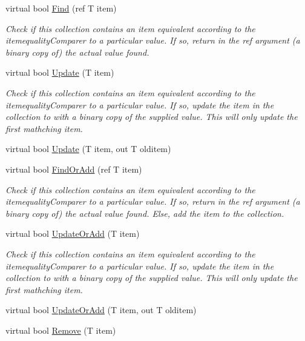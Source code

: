 \begin{DoxyCompactItemize}
virtual bool \hyperlink{class_c5_1_1_array_list_a835191c794936ab62f751aaef835254d}{Find} (ref T item)
\begin{DoxyCompactList}\small\item\em Check if this collection contains an item equivalent according to the itemequality\+Comparer to a particular value. If so, return in the ref argument (a binary copy of) the actual value found. \end{DoxyCompactList}\item 
virtual bool \hyperlink{class_c5_1_1_array_list_af3b4372db9e6040a7b26ec773a17dd76}{Update} (T item)
\begin{DoxyCompactList}\small\item\em Check if this collection contains an item equivalent according to the itemequality\+Comparer to a particular value. If so, update the item in the collection to with a binary copy of the supplied value. This will only update the first mathching item. \end{DoxyCompactList}\item 
virtual bool \hyperlink{class_c5_1_1_array_list_a9ab8634f890942de1711e5a8de88f6cc}{Update} (T item, out T olditem)
\item 
virtual bool \hyperlink{class_c5_1_1_array_list_a35b8836d9228034409fc10e4dc5d7779}{Find\+Or\+Add} (ref T item)
\begin{DoxyCompactList}\small\item\em Check if this collection contains an item equivalent according to the itemequality\+Comparer to a particular value. If so, return in the ref argument (a binary copy of) the actual value found. Else, add the item to the collection. \end{DoxyCompactList}\item 
virtual bool \hyperlink{class_c5_1_1_array_list_a2f38168aaa805fc305be7800e2298b9f}{Update\+Or\+Add} (T item)
\begin{DoxyCompactList}\small\item\em Check if this collection contains an item equivalent according to the itemequality\+Comparer to a particular value. If so, update the item in the collection to with a binary copy of the supplied value. This will only update the first mathching item. \end{DoxyCompactList}\item 
virtual bool \hyperlink{class_c5_1_1_array_list_a5bb957a4a9d9d8fa6040c0fe1c9d1237}{Update\+Or\+Add} (T item, out T olditem)
\item 
virtual bool \hyperlink{class_c5_1_1_array_list_a8e3d348ba6d557785028bee0b9a25bf8}{Remove} (T item)

\end{DoxyCompactItemize}

